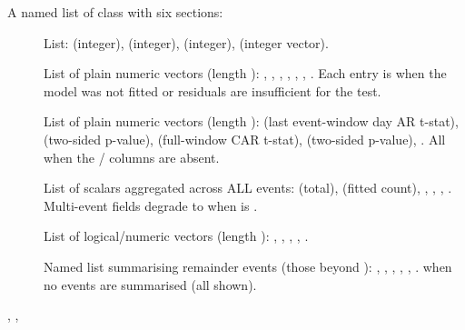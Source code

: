 \documentclass[a4paper]{book}
\begin{document}
\begin{Value}
A named list of class  with six sections:
\begin{description}

\item[] List:  (integer), 
(integer),  (integer), 
(integer vector).
\item[] List of plain numeric vectors (length
): , , ,
, , , .
Each entry is  when the model was not fitted or residuals
are insufficient for the test.
\item[] List of plain numeric vectors (length
):  (last event-window day AR t-stat),
 (two-sided p-value),  (full-window CAR t-stat),
 (two-sided p-value), . All 
when the / columns are absent.
\item[] List of scalars aggregated across ALL events:
 (total),  (fitted count),
, , , .
Multi-event fields degrade to  when 
is .
\item[] List of logical/numeric vectors (length
): , ,
, , .
\item[] Named list summarising remainder events
(those beyond ): ,
, , ,
, .  when no events
are summarised (all shown).

\end{description}

\end{Value}
%
\begin{SeeAlso}
, ,
\end{SeeAlso}
\end{document}
